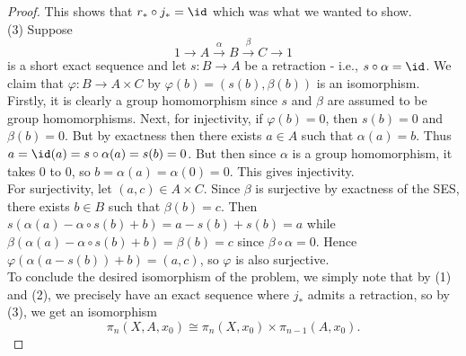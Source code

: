 \begin{proof}
        This shows that
        $r_* \circ j_* = \id$ which was what we wanted to show.\\
        \linebreak
        (3) Suppose
        \[
        1 \to A \stackrel{\alpha}{\to} B
        \stackrel{\beta}{\to} C \to 1
        \] 
        is a short exact sequence and
        let $s \colon B \to A$ be a retraction - i.e.,
        $s \circ \alpha = \id$.
        We claim that
        $\varphi \colon B \to A \times C$ by
        $\varphi (b) = \left( s(b),
        \beta(b)\right) $ is an isomorphism.
        Firstly, it is clearly a group homomorphism
        since $s$ and $\beta$ are assumed to be group homomorphisms.
        Next, for injectivity,
        if $\varphi (b) = 0$, then
        $s(b) = 0$ and $\beta(b) = 0$. But
        by exactness then there exists
        $a \in A$ such that $\alpha(a) = b$.
        Thus
        $a = \id (a)  = s \circ \alpha(a) 
        = s (b) = 0$. But then since
        $\alpha$ is a group homomorphism, it takes
        $0$ to $0$, so
        $b = \alpha(a) = \alpha(0) = 0$. This gives
        injectivity.\\
        For surjectivity, let
        $\left( a,c \right) \in A \times C$.
        Since $\beta$ is surjective by exactness of the SES,
        there exists $b \in B$ such that
        $\beta (b) = c$. Then
        $s (\alpha(a) - \alpha \circ s(b) +  b) =
        a - s(b) + s(b) = a$ while
        $\beta \left( \alpha(a) -
        \alpha \circ s(b) + b\right) 
        = \beta(b) = c$ since
        $\beta \circ \alpha = 0$. Hence
        $\varphi \left( \alpha(a - s(b))
         + b\right) = \left( a,c \right) $, so
         $\varphi $ is also surjective.\\
         To conclude the desired isomorphism of
         the problem, we simply note that
         by (1) and (2), we precisely have
         an exact sequence where
         $j_*$ admits a retraction, so
         by (3), we get an isomorphism
         \[
         \pi_n \left( X,A,x_0 \right) 
         \cong \pi_n (X,x_0) \times 
         \pi_{n-1}(A,x_0).
         \] 
    \end{proof}


